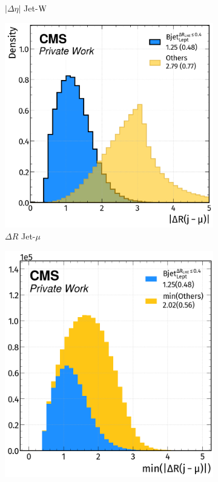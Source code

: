 \begin{figure}[H]
\begin{subfigure}{0.4825\linewidth}
        \caption{$|\Delta \eta|$ Jet-${\text{W}}$}
    \end{subfigure}  
    \hfill
    \begin{subfigure}{0.49\linewidth}
        \centering
        \includegraphics[width=1\linewidth]{fig//chap08-kin_reco/dr_mu.png}
        \caption{$\Delta R$ Jet-$\mu$}
    \end{subfigure}
    \hfill
    \begin{subfigure}{0.4585\linewidth}  
        \centering
        \includegraphics[width=1\linewidth]{fig//chap08-kin_reco/min_dr_mu.png}

\end{subfigure}
\end{figure}
